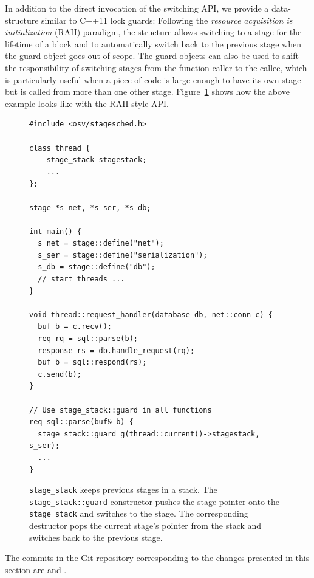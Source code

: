 \documentclass[12pt,a4paper]{book}
\begin{document}
In addition to the direct invocation of the switching API, we provide a data-structure similar to C++11 lock guards:
Following the \emph{resource acquisition is initialization} (RAII) paradigm, the structure allows switching to a stage for the lifetime of a block and to automatically switch back to the previous stage when the guard object goes out of scope.
The guard objects can also be used to shift the responsibility of switching stages from the function caller to the callee, which is particularly useful when a piece of code is large enough to have its own stage but is called from more than one other stage.
Figure~\ref{fig:di:api:examplestack} shows how the above example looks like with the RAII-style API.

\begin{figure}
\begin{lstlisting}[style=figurecpp,morekeywords={stage_stack,stage,stage::define,stage_stack::guard}]
#include <osv/stagesched.h>

class thread {
    stage_stack stagestack;
    ...
};

stage *s_net, *s_ser, *s_db;

int main() {
  s_net = stage::define("net");
  s_ser = stage::define("serialization");
  s_db = stage::define("db");
  // start threads ...
}

void thread::request_handler(database db, net::conn c) {
  buf b = c.recv();
  req rq = sql::parse(b);
  response rs = db.handle_request(rq);
  buf b = sql::respond(rs);
  c.send(b);
}

// Use stage_stack::guard in all functions
req sql::parse(buf& b) {
  stage_stack::guard g(thread::current()->stagestack, s_ser);
  ...
}

\end{lstlisting}
\caption{\lstinline[style=figurecpp]{stage_stack} keeps previous stages in a stack.
    The \lstinline[style=figurecpp]{stage_stack::guard} constructor pushes the stage pointer onto the \lstinline[style=figurecpp]{stage_stack} and switches to the stage.
    The corresponding destructor pops the current stage's pointer from the stack and switches back to the previous stage.}
\label{fig:di:api:examplestack}
\end{figure}

The commits in the Git repository corresponding to the changes presented in this section are  and .
\end{document}
